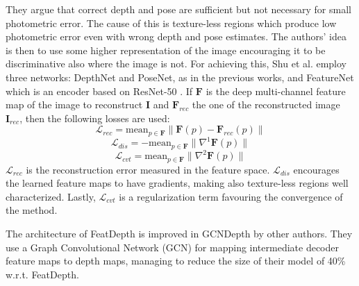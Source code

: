 They argue that correct depth and pose are sufficient but not necessary for small photometric error.
The cause of this is texture-less regions which produce low photometric error even with wrong depth and pose estimates.
The authors' idea is then to use some higher representation of the image encouraging it to be discriminative also where the image is not.
For achieving this, Shu et al. employ three networks: DepthNet and PoseNet, as in the previous works, and FeatureNet which is an encoder based on ResNet-50 \cite{ResNet}.
If $\mathbf{F}$ is the deep multi-channel feature map of the image to reconstruct $\mathbf{I}$ and $\mathbf{F}_{rec}$ the one of the reconstructed image $\mathbf{I}_{rec}$, then the following losses are used:
\[
	\mathcal{L}_{rec} = \text{mean}_{p \in \mathbf{F}} \big\| \mathbf{F}(p) - \mathbf{F}_{rec}(p) \big\|
\] \[
	\mathcal{L}_{dis} = - \text{mean}_{p \in \mathbf{F}} \big\| \nabla^{1} \mathbf{F}(p) \big\|
\] \[
	\mathcal{L}_{cvt} = \text{mean}_{p \in \mathbf{F}} \big\| \nabla^{2} \mathbf{F}(p) \big\|
\]
$\mathcal{L}_{rec}$ is the reconstruction error measured in the feature space.
$\mathcal{L}_{dis}$ encourages the learned feature maps to have gradients, making also texture-less regions well characterized.
Lastly, $\mathcal{L}_{cvt}$ is a regularization term favouring the convergence of the method.

The architecture of FeatDepth is improved in GCNDepth \cite{GCNDepth} by other authors.
They use a Graph Convolutional Network (GCN) for mapping intermediate decoder feature maps to depth maps, managing to reduce the size of their model of 40\% w.r.t. FeatDepth.